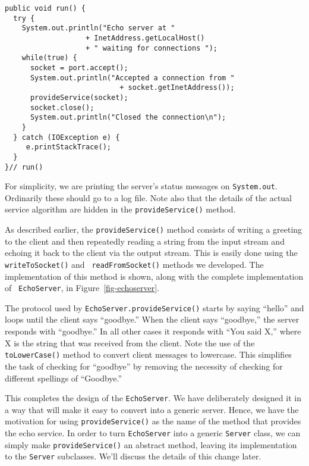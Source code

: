 \begin{jjjlisting}
\begin{lstlisting}
public void run() {
  try {
    System.out.println("Echo server at "
                   + InetAddress.getLocalHost() 
                   + " waiting for connections ");
    while(true) {
      socket = port.accept();
      System.out.println("Accepted a connection from " 
                           + socket.getInetAddress());
      provideService(socket);
      socket.close();
      System.out.println("Closed the connection\n");
    }
  } catch (IOException e) {
     e.printStackTrace();
  }
}// run()
\end{lstlisting}
\end{jjjlisting}

\noindent For simplicity, we are printing
the server's status messages on {\tt System.out}. Ordinarily these
should go to a log file.   Note also that the details of the actual
service algorithm are hidden in the {\tt provideService()} method.

As described earlier, the {\tt provideService()} method consists of
writing a greeting to the client and then repeatedly reading a string
from the input stream and echoing it back to the client via the output
stream.  This is easily done using the {\tt writeToSocket()} and {\tt
readFromSocket()} methods we developed.  The implementation of this
method is shown, along with the complete implementation of {\tt
EchoServer}, in Figure~\ref{fig-echoserver}.


The protocol used by {\tt EchoServer.provideService()} starts by
saying ``hello'' and loops until the client says ``goodbye.''  When
the client says ``goodbye,'' the server responds with ``goodbye.''  In
all other cases it responds with ``You said X,'' where X is the string
that was received from the client.   Note the use of the
{\tt toLowerCase()} method to convert client messages to lowercase.   This
simplifies the task of checking for ``goodbye'' by removing the necessity of
checking for different spellings of ``Goodbye.''


This completes the design of the {\tt EchoServer}. We have deliberately
designed it in a way that will make it easy to convert into a generic
server.  Hence, we have the motivation for using {\tt provideService()} as the
name of the method that provides the echo service.  In order to turn
{\tt EchoServer} into a generic {\tt Server} class, we can simply make
{\tt provideService()} an abstract method, leaving its implementation to
the {\tt Server} subclasses.  We'll discuss the details of this change
later.

